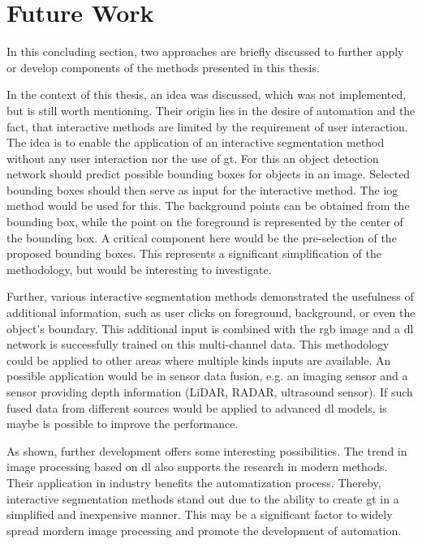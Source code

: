 
\section{Future Work}

In this concluding section, two approaches are briefly discussed to further apply or develop components of the methods presented in this thesis.

In the context of this thesis, an idea was discussed, which was not implemented, but is still worth mentioning.
Their origin lies in the desire of automation and the fact, that interactive methods are limited by the requirement of user interaction. 
The idea is to enable the application of an interactive segmentation method without any user interaction nor the use of \gls{gt}.
For this an object detection network should predict possible bounding boxes for objects in an image.
Selected bounding boxes should then serve as input for the interactive method.
The \gls{iog} method would be used for this.
The background points can be obtained from the bounding box, while the point on the foreground is represented by the center of the bounding box.
A critical component here would be the pre-selection of the proposed bounding boxes.
This represents a significant simplification of the methodology, but would be interesting to  investigate.

Further, various interactive segmentation methods \cite{Xu16-InteractiveObjectSelection}  \cite{MVL18-ITIS} \cite{Man18-DEXTR} \cite{Zha20-IOG} demonstrated the usefulness of additional information, such as user clicks on foreground, background, or even the object's boundary.
This additional input is combined with the \gls{rgb} image and a \gls{dl} network is successfully trained on this multi-channel data.
This methodology could be applied to other areas where multiple kinds inputs are available.
An possible application would be in sensor data fusion, e.g. an imaging sensor and a sensor providing depth information (LiDAR, RADAR, ultrasound sensor).
If such fused data from different sources would be applied to advanced \gls{dl} models, is maybe is possible to improve the performance.

As shown, further development offers some interesting possibilities.
The trend in image processing based on \gls{dl} also supports the research in modern methods.
Their application in industry benefits the automatization process.
Thereby, interactive segmentation methods stand out due to the ability to create \gls{gt} in a simplified and inexpensive manner.
This may be a significant factor to widely spread mordern image processing and promote the development of automation.
